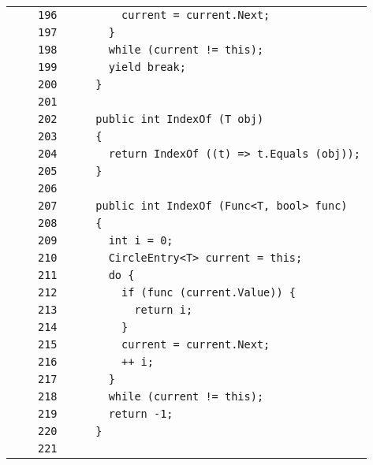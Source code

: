 \documentclass[a4paper,10pt]{article}
\begin{document}
\begin{longtable}[l]{lrrl}
\cellcolor{gray} &  & \verb~196~ & \verb~        current = current.Next;~\\
\cellcolor{gray} &  & \verb~197~ & \verb~      }~\\
\cellcolor{gray} &  & \verb~198~ & \verb~      while (current != this);~\\
\cellcolor{gray} &  & \verb~199~ & \verb~      yield break;~\\
\cellcolor{gray} &  & \verb~200~ & \verb~    }~\\
\cellcolor{gray} &  & \verb~201~ & \verb~~\\
\cellcolor{gray} &  & \verb~202~ & \verb~    public int IndexOf (T obj)~\\
\cellcolor{gray} &  & \verb~203~ & \verb~    {~\\
\cellcolor{gray} &  & \verb~204~ & \verb~      return IndexOf ((t) => t.Equals (obj));~\\
\cellcolor{gray} &  & \verb~205~ & \verb~    }~\\
\cellcolor{gray} &  & \verb~206~ & \verb~~\\
\cellcolor{gray} &  & \verb~207~ & \verb~    public int IndexOf (Func<T, bool> func)~\\
\cellcolor{gray} &  & \verb~208~ & \verb~    {~\\
\cellcolor{gray} &  & \verb~209~ & \verb~      int i = 0;~\\
\cellcolor{gray} &  & \verb~210~ & \verb~      CircleEntry<T> current = this;~\\
\cellcolor{gray} &  & \verb~211~ & \verb~      do {~\\
\cellcolor{gray} &  & \verb~212~ & \verb~        if (func (current.Value)) {~\\
\cellcolor{gray} &  & \verb~213~ & \verb~          return i;~\\
\cellcolor{gray} &  & \verb~214~ & \verb~        }~\\
\cellcolor{gray} &  & \verb~215~ & \verb~        current = current.Next;~\\
\cellcolor{gray} &  & \verb~216~ & \verb~        ++ i;~\\
\cellcolor{gray} &  & \verb~217~ & \verb~      }~\\
\cellcolor{gray} &  & \verb~218~ & \verb~      while (current != this);~\\
\cellcolor{gray} &  & \verb~219~ & \verb~      return -1;~\\
\cellcolor{gray} &  & \verb~220~ & \verb~    }~\\
\cellcolor{gray} &  & \verb~221~ & \verb~~\\

\end{longtable}
\end{document}
